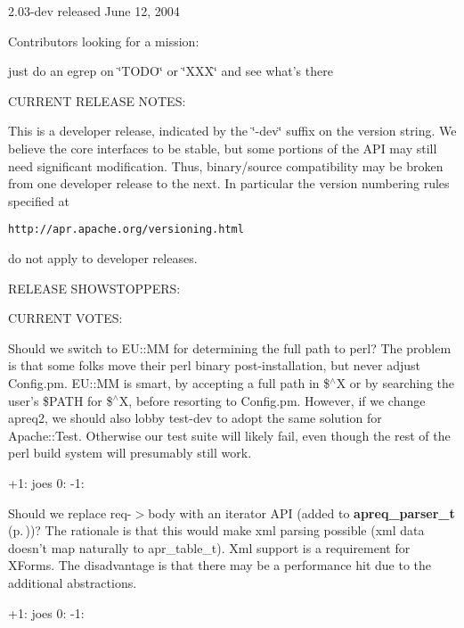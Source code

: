  2.03-dev released June 12, 2004

Contributors looking for a mission:

\begin{CompactItemize}
\item 
just do an egrep on \char`\"{}TODO\char`\"{} or \char`\"{}XXX\char`\"{} and see what's there\end{CompactItemize}
CURRENT RELEASE NOTES:

\begin{CompactItemize}
\item 
This is a developer release, indicated by the \char`\"{}-dev\char`\"{} suffix on the version string. We believe the core interfaces to be stable, but some portions of the API may still need significant modification. Thus, binary/source compatibility may be broken from one developer  release to the next. In particular the version numbering rules specified at\end{CompactItemize}
{\tt http://apr.apache.org/versioning.html}

do not apply to developer releases.

RELEASE SHOWSTOPPERS:

CURRENT VOTES:

\begin{CompactItemize}
\item 
Should we switch to EU::MM for determining the full path to perl? The problem is that some folks move their perl binary post-installation, but never adjust Config.pm. EU::MM is smart, by accepting a  full path in \$$^\wedge$X or by searching the user's \$PATH for \$$^\wedge$X, before resorting to Config.pm. However, if we change apreq2, we should also lobby test-dev to adopt the same solution for Apache::Test. Otherwise our test suite will likely fail, even though the rest of the perl build system will presumably still work.\end{CompactItemize}
+1: joes 0: -1:

\begin{CompactItemize}
\item 
Should we replace req-$>$body with an iterator API (added to {\bf apreq\_\-parser\_\-t} {\rm (p.\,\pageref{structapreq__parser__t})})? The rationale is that this would make xml parsing possible (xml data doesn't map naturally to apr\_\-table\_\-t). Xml support is a requirement for XForms. The disadvantage is that there may be a performance hit due to the additional abstractions.\end{CompactItemize}
+1: joes 0: -1:

